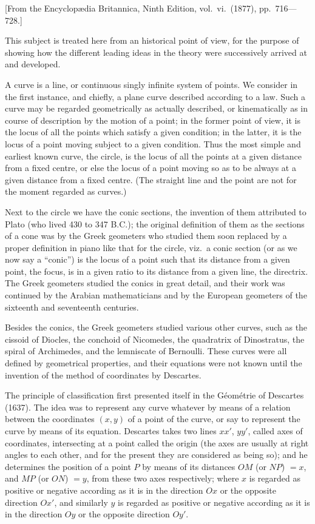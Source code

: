 \documentclass[11pt,a4paper]{article}
\begin{document}
\begin{flushright}
\small[From the Encyclop\ae{}dia Britannica, Ninth Edition, vol.~vi.\ (1877), pp.~716---728.]
\end{flushright}

This subject is treated here from an historical point of view, for the
purpose of showing how the different leading ideas in the theory were
successively arrived at and developed.

A curve is a line, or continuous singly infinite system of points. We
consider in the first instance, and chiefly, a plane curve described
according to a law. Such a curve may be regarded geometrically as
actually described, or kinematically as in course of description by the
motion of a point; in the former point of view, it is the locus of all
the points which satisfy a given condition; in the latter, it is the
locus of a point moving subject to a given condition. Thus the most
simple and earliest known curve, the circle, is the locus of all the
points at a given distance from a fixed centre, or else the locus of a
point moving so as to be always at a given distance from a fixed
centre. (The straight line and the point are not for the moment
regarded as curves.)

Next to the circle we have the conic sections, the invention of them
attributed to Plato (who lived 430 to 347 B.C.); the original
definition of them as the sections of a cone was by the Greek geometers
who studied them soon replaced by a proper definition in piano like
that for the circle, viz.\ a conic section (or as we now say a
``conic'') is the locus of a point such that its distance from a given
point, the focus, is in a given ratio to its distance from a given
line, the directrix. The Greek geometers studied the conics in great
detail, and their work was continued by the Arabian mathematicians and
by the European geometers of the sixteenth and seventeenth centuries.

Besides the conics, the Greek geometers studied various other curves,
such as the cissoid of Diocles, the conchoid of Nicomedes, the
quadratrix of Dinostratus, the spiral of Archimedes, and the
lemniscate of Bernoulli. These curves were all defined by geometrical
properties, and their equations were not known until the invention of
the method of coordinates by Descartes.

The principle of classification first presented itself in the
G\'{e}om\'{e}trie of Descartes (1637). The idea was to represent any
curve whatever by means of a relation between the coordinates $(x, y)$
of a point of the curve, or say to represent the curve by means of its
equation. Descartes takes two lines $xx'$, $yy'$, called axes of
coordinates, intersecting at a point called the origin (the axes are
usually at right angles to each other, and for the present they are
considered as being so); and he determines the position of a point $P$
by means of its distances $OM$ (or $NP$) $= x$, and $MP$ (or $ON$) $= y$,
from these two axes respectively; where $x$ is regarded as positive or
negative according as it is in the direction $Ox$ or the opposite
direction $Ox'$, and similarly $y$ is regarded as positive or negative
according as it is in the direction $Oy$ or the opposite direction
$Oy'$.
\end{document}
